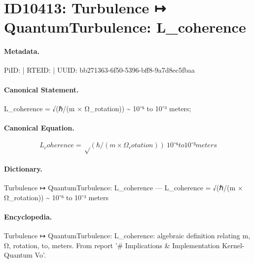 \section*{ID10413: Turbulence ↦ QuantumTurbulence: L\_coherence}
\paragraph{Metadata.}
PiID:  | RTEID:  | UUID: bb271363-6f50-5396-bff8-9a7d8ec5fbaa

\paragraph{Canonical Statement.}
L\_coherence = √(ℏ/(m × Ω\_rotation)) \textasciitilde{} 10⁻⁶ to 10⁻³ meters;

\paragraph{Canonical Equation.}
\[
L_coherence = √(ℏ/(m × Ω_rotation)) ~ 10⁻⁶ to 10⁻³ meters
\]

\paragraph{Dictionary.}
Turbulence ↦ QuantumTurbulence: L\_coherence — L\_coherence = √(ℏ/(m × Ω\_rotation)) \textasciitilde{} 10⁻⁶ to 10⁻³ meters

\paragraph{Encyclopedia.}
Turbulence ↦ QuantumTurbulence: L\_coherence: algebraic definition relating m, Ω, rotation, to, meters. From report '\# Implications \& Implementation Kernel- Quantum Vo'.

